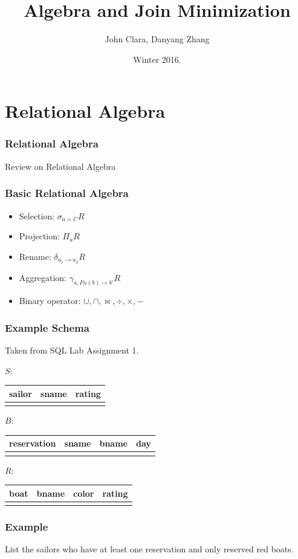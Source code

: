 \documentclass{beamer}
\begin{document}
\title{Algebra and Join Minimization}
\author{John Clara, Danyang Zhang}
\date[WI 2016]{Winter 2016.}

\subject{Algebra and Join Minimization}

\begin{frame}
  \titlepage
\end{frame}
\section{Relational Algebra}
\begin{frame}
  \frametitle{Relational Algebra}
  \begin{itemize}
  Review on Relational Algebra
  \end{itemize}
\end{frame}
\begin{frame}
  \frametitle{Basic Relational Algebra}
  \begin{itemize}
  \item Selection: $\sigma_{a=C} R$
  \item Projection: $\Pi_{a}R$
  \item Rename: $\delta_{a_1 \rightarrow a_2}R$
  \item Aggregation: $\gamma_{a, Fn(b)\rightarrow b'}R$
  \item Binary operator: $\cup, \cap, \bowtie, \div, \times, -$
  \end{itemize}
\end{frame}
\begin{frame}
\frametitle{Example Schema}
Taken from SQL Lab Assignment 1.

$S: $
\begin{tabular}{c|cc}
  sailor & sname & rating \\
  \hline
  \\
\end{tabular}

$B: $
\begin{tabular}{c|ccc}
  reservation & sname & bname & day\\
  \hline
  \\
\end{tabular}

$R:$
\begin{tabular}{c|ccc}
  boat & bname  & color & rating \\
  \hline
  \\
\end{tabular}
\end{frame}
\begin{frame}
\frametitle{Example}
List the sailors who have at least one reservation and only reserved red boats.  
\end{frame}
\end{document}
